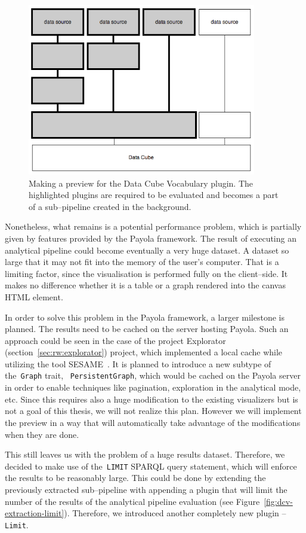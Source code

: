 \begin{figure}
	\centering
	\includegraphics[width=100mm]{img/dcv-extraction.png}
	\caption{Making a preview for the Data Cube Vocabulary plugin. The highlighted
	plugins are required to be evaluated and becomes a part of a sub--pipeline created
	in the background.}
	\label{fig:dcv-extraction}
\end{figure}

Nonetheless, what remains is a potential performance problem, which is partially given 
by features provided by the Payola framework. The result of executing an 
analytical pipeline could become eventually a very huge dataset. A dataset so 
large that it may not fit into the memory of the user's computer. That is a 
limiting factor, since the visualisation is performed fully on the client--side. 
It makes no difference whether it is a table or a graph rendered into the canvas HTML element.

In order to solve this problem in the Payola framework, a larger milestone is 
planned. The results need to be cached on the server hosting Payola.
Such an approach could be seen in the case of the project 
Explorator (section~\ref{sec:rw:explorator}) project, which implemented a local cache
while utilizing the tool SESAME~\cite{sesame}. It is planned to introduce a new 
subtype of the~\texttt{Graph} trait, ~\texttt{PersistentGraph}, which would be 
cached on the Payola server in order to enable techniques like pagination, 
exploration in the analytical mode, etc. Since this requires also a huge 
modification to the existing visualizers but is not a goal of this thesis, we will 
not realize this plan. However we will implement the preview in a way that will 
automatically take advantage of the modifications when they are done.

This still leaves us with the problem of a huge results dataset. Therefore, we 
decided to make use of the~\texttt{LIMIT} SPARQL query statement, which will 
enforce the results to be reasonably large. This could be done by 
extending the previously extracted sub--pipeline with appending a plugin that 
will limit the number of the results of the analytical
pipeline evaluation (see Figure~\ref{fig:dcv-extraction-limit}). Therefore, we 
introduced another completely new plugin -- \texttt{Limit}.

